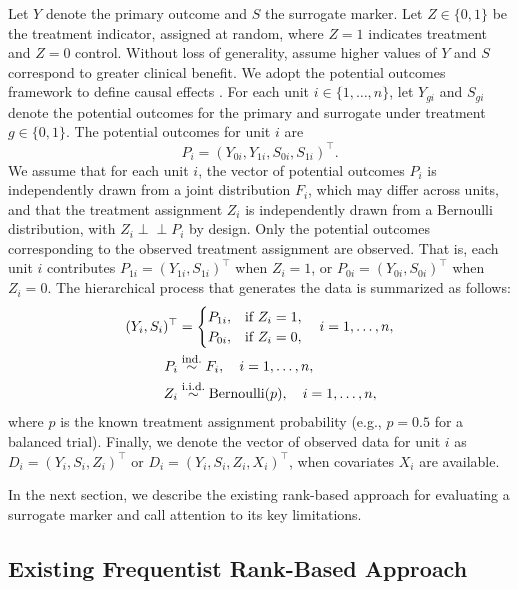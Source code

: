 \documentclass[referee,usenatbib]{biom}
\newcommand{\iid}{\overset{\text{\footnotesize i.i.d.}}{\sim}}
\newcommand{\indep}{\perp \!\!\! \perp}
\begin{document}
Let \(Y\) denote the primary outcome and \(S\) the surrogate marker. Let \(Z \in \{0,1\}\) be the treatment indicator, assigned at random, where \(Z=1\) indicates treatment and \(Z=0\) control. Without loss of generality, assume higher values of \(Y\) and \(S\) correspond to greater clinical benefit. We adopt the potential outcomes framework to define causal effects \citep{rubin1974estimating}. For each unit \(i \in \{1,\ldots,n\}\), let \(Y_{gi}\) and \(S_{gi}\) denote the potential outcomes for the primary and surrogate under treatment \(g \in \{0,1\}\). The potential outcomes for unit \(i\) are
\[
  P_{i} = (Y_{0i}, Y_{1i}, S_{0i}, S_{1i})^{\top}.
\]
We assume that for each unit \(i\), the vector of potential outcomes \(P_i\) is independently drawn from a joint distribution \(F_i\), which may differ across units, and that the treatment assignment \(Z_i\) is independently drawn from a Bernoulli distribution, with \(Z_i \indep P_i\) by design. Only the potential outcomes corresponding to the observed treatment assignment are observed. That is, each unit \(i\) contributes \(P_{1i} = (Y_{1i}, S_{1i})^{\top}\) when \(Z_i = 1\), or \(P_{0i} = (Y_{0i}, S_{0i})^{\top}\) when \(Z_i = 0\). The hierarchical process that generates the data is summarized as follows:
\begin{equation}
  \label{eq:data_generating_process}
  \begin{aligned}
    (Y_{i}, S_{i})^{\top} &=
    \begin{cases}
      P_{1i}, & \text{if } Z_{i} = 1, \\
      P_{0i}, & \text{if } Z_{i} = 0,
    \end{cases} \quad i = 1, \ldots, n, \\
    P_i &\overset{\text{\footnotesize ind.}}{\sim} F_i, \quad i = 1, \ldots, n, \\
    Z_{i} &\iid \text{Bernoulli}(p), \quad i = 1, \ldots, n,
  \end{aligned}
\end{equation}
where \(p\) is the known treatment assignment probability (e.g., \(p = 0.5\) for a balanced trial). Finally, we denote the vector of observed data for unit \(i\) as \(D_i = (Y_i, S_i, Z_i)^{\top}\) or \(D_i = (Y_i, S_i, Z_i, X_i)^{\top}\), when covariates \(X_i\) are available.

In the next section, we describe the existing rank-based approach for evaluating a surrogate marker and call attention to its key limitations.

\subsection{Existing Frequentist Rank-Based Approach}\label{subsec:frequentist_approach}
\end{document}
